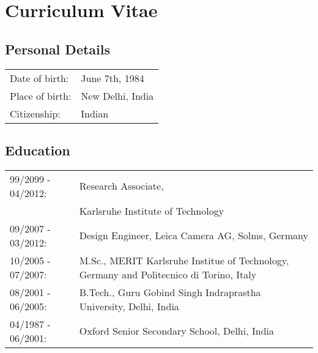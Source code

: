 \chapter*{Curriculum Vitae}

\section*{Personal Details}
\begin{tabular}[]{ll}
	Date of birth: & June 7th, 1984 \\
	Place of birth: & New Delhi, India \\
	Citizenship: & Indian
\end{tabular}

\section*{Education}

\begin{tabular}[]{lp{6.95cm}}
	
	99/2099 - 04/2012: & Research Associate, \\
										 & Karlsruhe Institute of Technology \\
	09/2007 - 03/2012: & Design Engineer, Leica Camera AG, Solms, Germany \\
	10/2005 - 07/2007: & M.Sc., MERIT Karlsruhe Institue of Technology, Germany and Politecnico di Torino, Italy \\
	08/2001 - 06/2005: & B.Tech., Guru Gobind Singh Indraprastha University, Delhi, India \\
	04/1987 - 06/2001: & Oxford Senior Secondary School, Delhi, India 	
\end{tabular}

